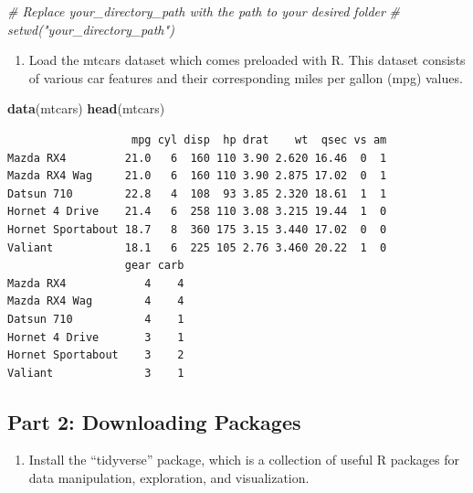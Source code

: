 \documentclass[
]{book}
\newenvironment{Shaded}{\begin{snugshade}}{\end{snugshade}}
\newcommand{\CommentTok}[1]{\textcolor[rgb]{0.56,0.35,0.01}{\textit{#1}}}
\newcommand{\FunctionTok}[1]{\textcolor[rgb]{0.13,0.29,0.53}{\textbf{#1}}}
\newcommand{\NormalTok}[1]{#1}
\providecommand{\tightlist}{%
  \setlength{\itemsep}{0pt}\setlength{\parskip}{0pt}}
\begin{document}
\begin{Shaded}
\begin{Highlighting}[]
\CommentTok{\# Replace \textquotesingle{}your\_directory\_path\textquotesingle{} with the path to your desired folder}
\CommentTok{\# setwd("your\_directory\_path")}
\end{Highlighting}
\end{Shaded}

\begin{enumerate}
\def\labelenumi{\arabic{enumi}.}
\setcounter{enumi}{1}
\tightlist
\item
  Load the mtcars dataset which comes preloaded with R. This dataset consists of various car features and their corresponding miles per gallon (mpg) values.
\end{enumerate}

\begin{Shaded}
\begin{Highlighting}[]
\FunctionTok{data}\NormalTok{(mtcars)}
\FunctionTok{head}\NormalTok{(mtcars)}
\end{Highlighting}
\end{Shaded}

\begin{verbatim}
                   mpg cyl disp  hp drat    wt  qsec vs am
Mazda RX4         21.0   6  160 110 3.90 2.620 16.46  0  1
Mazda RX4 Wag     21.0   6  160 110 3.90 2.875 17.02  0  1
Datsun 710        22.8   4  108  93 3.85 2.320 18.61  1  1
Hornet 4 Drive    21.4   6  258 110 3.08 3.215 19.44  1  0
Hornet Sportabout 18.7   8  360 175 3.15 3.440 17.02  0  0
Valiant           18.1   6  225 105 2.76 3.460 20.22  1  0
                  gear carb
Mazda RX4            4    4
Mazda RX4 Wag        4    4
Datsun 710           4    1
Hornet 4 Drive       3    1
Hornet Sportabout    3    2
Valiant              3    1
\end{verbatim}

\hypertarget{part-2-downloading-packages}{%
\subsection{Part 2: Downloading Packages}\label{part-2-downloading-packages}}

\begin{enumerate}
\def\labelenumi{\arabic{enumi}.}
\tightlist
\item
  Install the ``tidyverse'' package, which is a collection of useful R packages for data manipulation, exploration, and visualization.
\end{enumerate}
\end{document}
